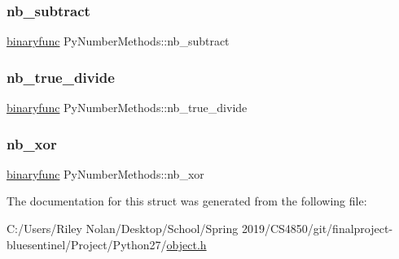 \mbox{\label{struct_py_number_methods_aa92ce9adbe4345ed779e32fbec1633b9}} 
\subsubsection{\texorpdfstring{nb\_subtract}{nb\_subtract}}
{\footnotesize\ttfamily \mbox{\hyperlink{_python27_2object_8h_a1a50b2d154f36acb9d215f2cdc1561a8}{binaryfunc}} Py\+Number\+Methods\+::nb\+\_\+subtract}

\mbox{\label{struct_py_number_methods_a7de1a2730c487e2dcce5babec5b24bed}} 
\subsubsection{\texorpdfstring{nb\_true\_divide}{nb\_true\_divide}}
{\footnotesize\ttfamily \mbox{\hyperlink{_python27_2object_8h_a1a50b2d154f36acb9d215f2cdc1561a8}{binaryfunc}} Py\+Number\+Methods\+::nb\+\_\+true\+\_\+divide}

\mbox{\label{struct_py_number_methods_af66f02aa7e6385879627498f944a666a}} 
\subsubsection{\texorpdfstring{nb\_xor}{nb\_xor}}
{\footnotesize\ttfamily \mbox{\hyperlink{_python27_2object_8h_a1a50b2d154f36acb9d215f2cdc1561a8}{binaryfunc}} Py\+Number\+Methods\+::nb\+\_\+xor}



The documentation for this struct was generated from the following file\+:\begin{DoxyCompactItemize}
\item 
C\+:/\+Users/\+Riley Nolan/\+Desktop/\+School/\+Spring 2019/\+C\+S4850/git/finalproject-\/bluesentinel/\+Project/\+Python27/\mbox{\hyperlink{_python27_2object_8h}{object.\+h}}\end{DoxyCompactItemize}
